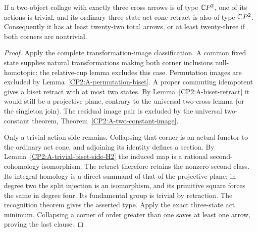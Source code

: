 \begin{theorem}
\label{CP2:A-three-cross-reduction}
If a two-object collage with exactly three cross arrows is
of type $\mathbb{C}P^2$, one of its actions is trivial, and its
ordinary three-state act-cone retract is also of type $\mathbb{C}P^2$.
Consequently it has at least twenty-two total arrows,
or at least twenty-three if both corners are nontrivial.
\end{theorem}
\begin{proof}
Apply the complete transformation-image classification.
A common fixed state supplies natural transformations
making both corner inclusions null-homotopic; the
relative-cup lemma excludes this case. Permutation images
are excluded by Lemma~\ref{CP2:A-permutation-biset}.
A proper commuting idempotent gives a biset retract
with at most two states. By Lemma~\ref{CP2:A-biset-retract}
it would still be a projective plane, contrary to the
universal two-cross lemma (or the singleton join).
The residual image pair is excluded by the universal
two-constant theorem, Theorem~\ref{CP2:A-two-constant-image}.

Only a trivial action side remains. Collapsing that
corner is an actual functor to the ordinary act cone,
and adjoining its identity defines a section. By
Lemma~\ref{CP2:A-trivial-biset-side-H2} the induced
map is a rational second-cohomology isomorphism. The
retract therefore retains the nonzero second class.
Its integral homology is a direct summand of that of
the projective plane; in degree two the split injection
is an isomorphism, and its primitive square forces
the same in degree four. Its fundamental group is
trivial by retraction. The recognition theorem gives
the asserted type. Apply the exact three-state act
minimum. Collapsing a corner of order greater than
one saves at least one arrow, proving the last clause.
\end{proof}
